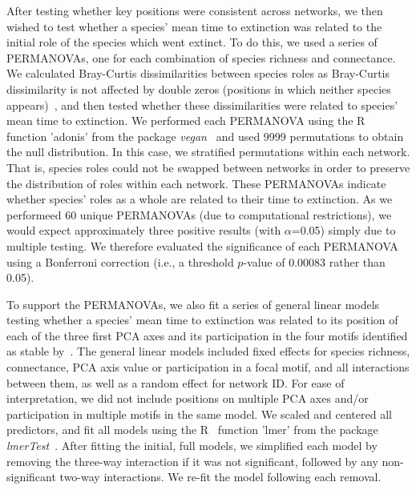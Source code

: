 \documentclass[12pt]{article}
\begin{document}
			After testing whether key positions were consistent across networks, we then wished to test whether a species' mean time to extinction was related to the initial role of the species which went extinct. To do this, we used a series of PERMANOVAs,  one for each combination of species richness and connectance. We calculated Bray-Curtis dissimilarities between species roles as Bray-Curtis dissimilarity is not affected by double zeros (positions in which neither species appears)~\citep{Baker2015,Cirtwill2015}, and then tested whether these dissimilarities were related to species' mean time to extinction. We performed each  PERMANOVA using the R~\citep{R} function 'adonis' from the package \emph{vegan}~\citep{vegan} and used 9999 permutations to obtain the null distribution. In this case, we stratified permutations within each network. That is, species roles could not be swapped between networks in order to preserve the distribution of roles within each network. These PERMANOVAs indicate whether species' roles as a whole are related to their time to extinction. As we performeed 60 unique PERMANOVAs (due to computational restrictions), we would expect approximately three positive results (with $\alpha$=0.05) simply due to multiple testing. We therefore evaluated the significance of each PERMANOVA using a Bonferroni correction (i.e., a threshold $p$-value of 0.00083 rather than 0.05).



			To support the PERMANOVAs, we also fit a series of general linear models testing whether a species' mean time to extinction was related to its position of each of the three first PCA axes and its participation in the four motifs identified as stable by~\citet{Borrelli}. The general linear models included fixed effects for species richness, connectance, PCA axis value or participation in a focal motif, and all interactions between them, as well as a random effect for network ID. For ease of interpretation, we did not include positions on multiple PCA axes and/or participation in multiple motifs in the same model. We scaled and centered all predictors, and fit all models using the R~\citep{R} function 'lmer' from the package \emph{lmerTest}~\citep{lmerTest}. After fitting the initial, full models, we simplified each model by removing the three-way interaction if it was not significant, followed by any non-significant two-way interactions. We re-fit the model following each removal.
\end{document}
